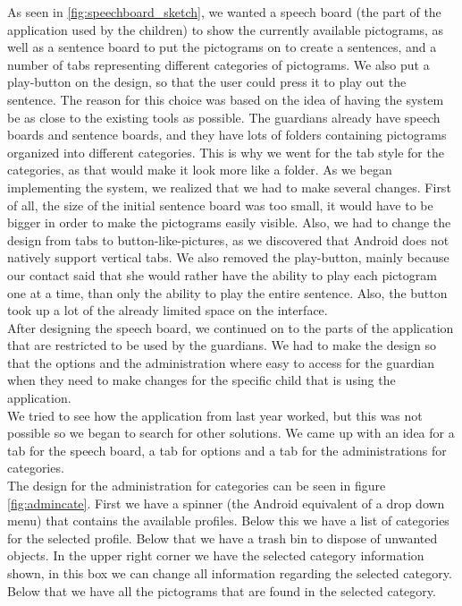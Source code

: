 As seen in \autoref{fig:speechboard_sketch}, we wanted a speech board (the part of the application used by the children) to show the currently available pictograms, as well as a sentence board to put the pictograms on to create a sentences, and a number of tabs representing different categories of pictograms. We also put a play-button on the design, so that the user could press it to play out the sentence.\newline
The reason for this choice was based on the idea of having the system be as close to the existing tools as possible. The guardians already have speech boards and sentence boards, and they have lots of folders containing pictograms organized into different categories. This is why we went for the tab style for the categories, as that would make it look more like a folder.\newline
As we began implementing the system, we realized that we had to make several changes. First of all, the size of the initial sentence board was too small, it would have to be bigger in order to make the pictograms easily visible. Also, we had to change the design from tabs to button-like-pictures, as we discovered that Android does not natively support vertical tabs. We also removed the play-button, mainly because our contact said that she would rather have the ability to play each pictogram one at a time, than only the ability to play the entire sentence. Also, the button took up a lot of the already limited space on the interface.\newline
\\
After designing the speech board, we continued on to the parts of the application that are restricted to be used by the guardians. We had to make the design so that the options and the administration where easy to access for the guardian when they need to make changes for the specific child that is using the application. 
\\
We tried to see how the application from last year worked, but this was not possible so we began to search for other solutions. We came up with an idea for a tab for the speech board, a tab for options and a tab for the administrations for categories.\\

The design for the administration for categories can be seen in figure \ref{fig:admincate}. First we have a spinner (the Android equivalent of a drop down menu) that contains the available profiles. Below this we have a list of  categories for the selected profile. Below that we have a trash bin to dispose of unwanted objects. In the upper right corner we have the selected category information shown, in this box we can change all information regarding the selected category. Below that we have all the pictograms that are found in the selected category.       

